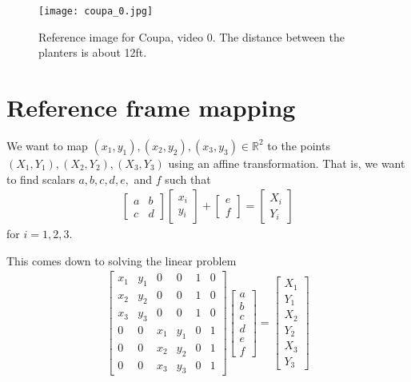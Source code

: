 \documentclass[12pt]{amsart}
\begin{document}
\begin{figure}[htbp] %
   \centering
   \texttt{[image: coupa\_0.jpg]} 
   \caption{Reference image for Coupa, video 0. The distance between the planters is about 12ft.}
   \label{fig:coupa}
\end{figure}

\appendix
\section{Reference frame mapping}
We want to map $(x_1,y_1),(x_2,y_2),(x_3,y_3) \in \mathbb{R}^2$ to the points $(X_1,Y_1),(X_2,Y_2),(X_3,Y_3)$ using an affine transformation.
That is, we want to find scalars $a,b,c,d,e,$ and $f$ such that
\begin{align*}
	\begin{bmatrix}
		a & b \\
		c & d
	\end{bmatrix}
	\begin{bmatrix}
		x_i \\
		y_i
	\end{bmatrix}
	+ 
	\begin{bmatrix}
	e\\
	f
	\end{bmatrix} = 
	\begin{bmatrix}
	X_i \\
	Y_i
	\end{bmatrix}
\end{align*} 
for $i=1,2,3$.

This comes down to solving the linear problem
\begin{align*}
	\begin{bmatrix}
	x_1 & y_1 & 0 & 0 & 1 & 0 \\
	x_2 & y_2 & 0 & 0 & 1 & 0 \\
	x_3 & y_3 & 0 & 0 & 1 & 0 \\
	0 & 0 & x_1 & y_1 & 0 & 1 \\
	0 & 0 & x_2 & y_2 & 0 & 1 \\
	0 & 0 & x_3 & y_3 & 0 & 1
	\end{bmatrix}
	\begin{bmatrix}
		a \\ b \\ c \\ d \\ e \\ f 
	\end{bmatrix}
	=
	\begin{bmatrix}
		X_1 \\
		Y_1 \\
		X_2 \\
		Y_2 \\
		X_3 \\
		Y_3
	\end{bmatrix}
\end{align*}
\end{document}
